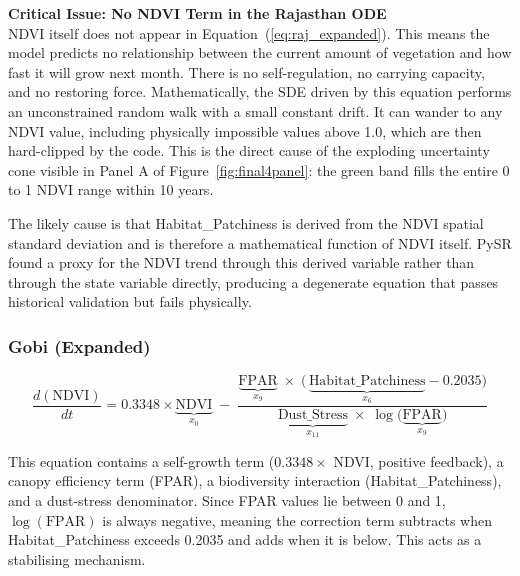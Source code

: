 \documentclass[12pt, a4paper]{article}
\begin{document}
\begin{mdframed}[style=warnbox]
\textbf{\textcolor{warnred}{Critical Issue: No NDVI Term in the
Rajasthan ODE}}
\label{sec:ode_raj_issue}\\[4pt]
NDVI itself does not appear in Equation~(\ref{eq:raj_expanded}). This
means the model predicts no relationship between the current amount of
vegetation and how fast it will grow next month. There is no
self-regulation, no carrying capacity, and no restoring force.
Mathematically, the SDE driven by this equation performs an unconstrained
random walk with a small constant drift. It can wander to any NDVI value,
including physically impossible values above 1.0, which are then
hard-clipped by the code. This is the direct cause of the exploding
uncertainty cone visible in Panel A of Figure~\ref{fig:final4panel}: the
green band fills the entire 0 to 1 NDVI range within 10 years.

The likely cause is that Habitat\_Patchiness is derived from the NDVI
spatial standard deviation and is therefore a mathematical function of
NDVI itself. PySR found a proxy for the NDVI trend through this derived
variable rather than through the state variable directly, producing a
degenerate equation that passes historical validation but fails
physically.
\end{mdframed}

\subsubsection{Gobi (Expanded)}

\begin{equation}
    \frac{d(\text{NDVI})}{dt} =
    0.3348 \times \underbrace{\text{NDVI}}_{x_0}
    \;-\;
    \frac{
        \underbrace{\text{FPAR}}_{x_9}
        \;\times\;
        \bigl(\,\underbrace{\text{Habitat\_Patchiness}}_{x_6}
        - 0.2035\bigr)
    }{
        \underbrace{\text{Dust\_Stress}}_{x_{11}}
        \;\times\;
        \log\!\bigl(\underbrace{\text{FPAR}}_{x_9}\bigr)
    }
    \label{eq:gobi_expanded}
\end{equation}

This equation contains a self-growth term ($0.3348 \times$ NDVI, positive
feedback), a canopy efficiency term (FPAR), a biodiversity interaction
(Habitat\_Patchiness), and a dust-stress denominator. Since FPAR values
lie between 0 and 1, $\log(\text{FPAR})$ is always negative, meaning the
correction term subtracts when Habitat\_Patchiness exceeds 0.2035 and
adds when it is below. This acts as a stabilising mechanism.
\end{document}
